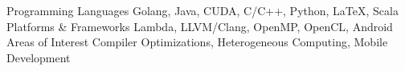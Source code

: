 \begin{cventries}
\vspace{-10mm}
    \cvskill
    {Programming Languages}
    {Golang, Java, CUDA, C/C++, Python, LaTeX, Scala}
    \cvskill
    {Platforms \& Frameworks}
    {Lambda, LLVM/Clang, OpenMP, OpenCL, Android}
    \cvskill
    {Areas of Interest}
    {Compiler Optimizations, Heterogeneous Computing, Mobile Development}
\end{cventries}
